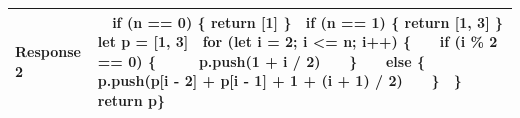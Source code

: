 \documentclass{article} %
\begin{document}
\begin{center}
\begin{longtable}{p{2.5cm}|p{10cm}}
   \textbf{Response 2}   &    \verb|  |if (n == 0) \{ return [1] \}\newline\verb|  |if (n == 1) \{ return [1, 3] \}\newline\verb|  |let p = [1, 3]\newline\verb|  |for (let i = 2; i <= n; i++) \{\newline\verb|    |if (i \% 2 == 0) \{\newline\verb|      |p.push(1 + i / 2)\newline\verb|    |\}\newline\verb|    |else \{\newline\verb|      |p.push(p[i - 2] + p[i - 1] + 1 + (i + 1) / 2)\newline\verb|    |\}\newline\verb|  |\}\newline\verb|  |return p\newline\}   \\ \midrule

\end{longtable}
\end{center}
\end{document}
